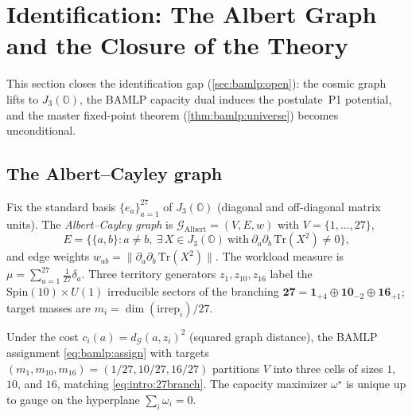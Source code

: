 \section{Identification: The Albert Graph and the Closure of the Theory}
\label{sec:identification:main}

This section closes the identification gap (\autoref{sec:bamlp:open}): the cosmic
graph lifts to $J_3(\mathbb{O})$, the BAMLP capacity dual induces the
postulate~\textnormal{P1} potential, and the master fixed-point theorem
(\autoref{thm:bamlp:universe}) becomes unconditional.

\subsection{The Albert--Cayley graph}
\label{sec:identification:graph}

\begin{definition}\label{def:identification:graph}
Fix the standard basis $\{e_a\}_{a=1}^{27}$ of $J_3(\mathbb{O})$ (diagonal and
off-diagonal matrix units). The \emph{Albert--Cayley graph} is
$\mathcal{G}_{\mathrm{Albert}}=(V,E,w)$ with $V=\{1,\dots,27\}$,
\begin{equation}
  E=\bigl\{\{a,b\}: a\ne b,\ \exists\,X\in J_3(\mathbb{O})\ \text{with}\ 
  \partial_a\partial_b\,\mathrm{Tr}(X^2)\ne0\bigr\},
\end{equation}
and edge weights $w_{ab}=\|\partial_a\partial_b\,\mathrm{Tr}(X^2)\|$. The
workload measure is $\mu=\sum_{a=1}^{27}\tfrac{1}{27}\delta_a$. Three territory
generators $z_1,z_{10},z_{16}$ label the $\mathrm{Spin}(10)\times U(1)$
irreducible sectors of the branching
$\mathbf{27}=\mathbf{1}_{+4}\oplus\mathbf{10}_{-2}\oplus\mathbf{16}_{+1}$; target
masses are $m_i=\dim(\mathrm{irrep}_i)/27$.
\end{definition}

\begin{theorem}\label{thm:identification:branch}
Under the cost $c_i(a)=d_{\mathcal{G}}(a,z_i)^2$ (squared graph distance), the
BAMLP assignment \eqref{eq:bamlp:assign} with targets
$(m_1,m_{10},m_{16})=(1/27,10/27,16/27)$ partitions $V$ into three cells of
sizes $1$, $10$, and $16$, matching \eqref{eq:intro:27branch}. The capacity
maximizer $\omega^\star$ is unique up to gauge on the hyperplane
$\sum_i\omega_i=0$.
\end{theorem}

